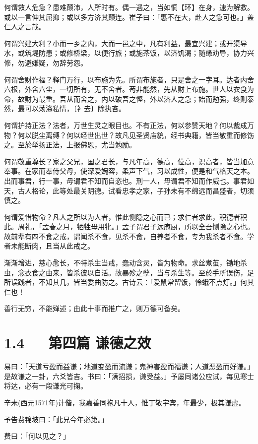 \documentclass[letterpaper,12pt,english]{sphinxmanual}
\begin{document}
何谓救人危急？患难颠沛，人所时有。偶一遇之，当如恫【环】在身，速为解救。或以一言伸其屈抑；或以多方济其颠连。崔子曰：「惠不在大，赴人之急可也。」盖仁人之言哉。

何谓兴建大利？小而一乡之内，大而一邑之中，凡有利益，最宜兴建；或开渠导水，或筑堤防患；或修桥梁，以便行旅；或施茶饭，以济饥渴；随缘劝导，协力兴修，勿避嫌疑，勿辞劳怨。

何谓舍财作福？释门万行，以布施为先。所谓布施者，只是舍之一字耳。达者内舍六根，外舍六尘，一切所有，无不舍者。苟非能然，先从财上布施。世人以衣食为命，故财为最重。吾从而舍之，内以破吾之悭，外以济人之急；始而勉强，终则泰然，最可以荡涤私情，〔衤去〕除执吝。

何谓护持正法？法者，万世生灵之眼目也。不有正法，何以参赞天地？何以裁成万物？何以脱尘离缚？何以经世出世？故凡见圣贤庙貌，经书典籍，皆当敬重而修饬之。至於举扬正法，上报佛恩，尤当勉励。

何谓敬重尊长？家之父兄，国之君长，与凡年高，德高，位高，识高者，皆当加意奉事。在家而奉侍父母，使深爱婉容，柔声下气，习以成性，便是和气格天之本。出而事君，行一事，毋谓君不知而自恣也。刑一人，毋谓君不知而作威也。事君如天，古人格论，此等处最关阴德。试看忠孝之家，子孙未有不绵远而昌盛者，切须慎之。

何谓爱惜物命？凡人之所以为人者，惟此恻隐之心而已；求仁者求此，积德者积此。周礼，「孟春之月，牺牲毋用牝。」孟子谓君子远庖厨，所以全吾恻隐之心也。故前辈有四不食之戒，谓闻杀不食，见杀不食，自养者不食，专为我杀者不食。学者未能断肉，且当从此戒之。

渐渐增进，慈心愈长，不特杀生当戒，蠢动含灵，皆为物命。求丝煮茧，锄地杀虫，念衣食之由来，皆杀彼以自活。故暴殄之孽，当与杀生等。至於手所误伤，足所误践者，不知其几，皆当委曲防之。古诗云：「爱鼠常留饭，怜蛾不点灯。」何其仁也！

善行无穷，不能殚述；由此十事而推广之，则万德可备矣。


\section{1.4   第四篇 谦德之效}
\label{\detokenize{p00_u5176_u5b83/_u8881_u4e86_u51e1-_u4e86_u51e1_u56db_u8bad:id6}}
易曰：「天道亏盈而益谦；地道变盈而流谦；鬼神害盈而福谦；人道恶盈而好谦。」是故谦之一卦，六爻皆吉。书曰：「满招损，谦受益。」予屡同诸公应试，每见寒士将达，必有一段谦光可掬。

辛未(西元1571年)计偕，我嘉善同袍凡十人，惟丁敬宇宾，年最少，极其谦虚。

予告费锦坡曰：「此兄今年必第。」

费曰：「何以见之？」
\end{document}
